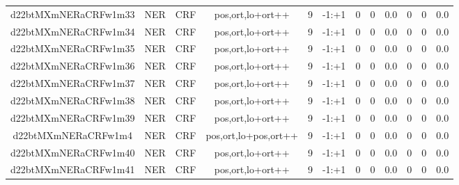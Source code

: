 \documentclass[a4paper]{article}
\begin{document}
\begin{landscape}
\begin{center}
\begin{tabular}{ |c|c|c|c|c|c|c|c|c|c|c|c|}
 
 	
 	\small{ d22btMXmNERaCRFw1m33 } & \small{ NER} & \small{  CRF }  & pos,ort,lo+ort++  &  9 &  \small{  -1:+1 }  &  0 & 0 & 0.0  &  0 & 0 & 0.0 \\
 	

 
 	
 	\small{ d22btMXmNERaCRFw1m34 } & \small{ NER} & \small{  CRF }  & pos,ort,lo+ort++  &  9 &  \small{  -1:+1 }  &  0 & 0 & 0.0  &  0 & 0 & 0.0 \\
 	

 
 	
 	\small{ d22btMXmNERaCRFw1m35 } & \small{ NER} & \small{  CRF }  & pos,ort,lo+ort++  &  9 &  \small{  -1:+1 }  &  0 & 0 & 0.0  &  0 & 0 & 0.0 \\
 	

 
 	
 	\small{ d22btMXmNERaCRFw1m36 } & \small{ NER} & \small{  CRF }  & pos,ort,lo+ort++  &  9 &  \small{  -1:+1 }  &  0 & 0 & 0.0  &  0 & 0 & 0.0 \\
 	

 
 	
 	\small{ d22btMXmNERaCRFw1m37 } & \small{ NER} & \small{  CRF }  & pos,ort,lo+ort++  &  9 &  \small{  -1:+1 }  &  0 & 0 & 0.0  &  0 & 0 & 0.0 \\
 	

 
 	
 	\small{ d22btMXmNERaCRFw1m38 } & \small{ NER} & \small{  CRF }  & pos,ort,lo+ort++  &  9 &  \small{  -1:+1 }  &  0 & 0 & 0.0  &  0 & 0 & 0.0 \\
 	

 
 	
 	\small{ d22btMXmNERaCRFw1m39 } & \small{ NER} & \small{  CRF }  & pos,ort,lo+ort++  &  9 &  \small{  -1:+1 }  &  0 & 0 & 0.0  &  0 & 0 & 0.0 \\
 	

 
 	
 	\small{ d22btMXmNERaCRFw1m4 } & \small{ NER} & \small{  CRF }  & pos,ort,lo+pos,ort++  &  9 &  \small{  -1:+1 }  &  0 & 0 & 0.0  &  0 & 0 & 0.0 \\
 	

 
 	
 	\small{ d22btMXmNERaCRFw1m40 } & \small{ NER} & \small{  CRF }  & pos,ort,lo+ort++  &  9 &  \small{  -1:+1 }  &  0 & 0 & 0.0  &  0 & 0 & 0.0 \\
 	

 
 	
 	\small{ d22btMXmNERaCRFw1m41 } & \small{ NER} & \small{  CRF }  & pos,ort,lo+ort++  &  9 &  \small{  -1:+1 }  &  0 & 0 & 0.0  &  0 & 0 & 0.0 \\
 	


\end{tabular}
\end{center}
\end{landscape}
\end{document}
